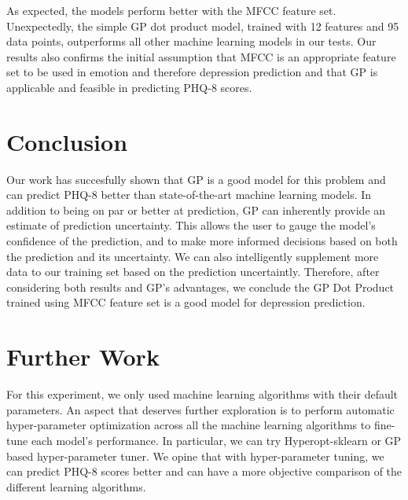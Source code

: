 \documentclass{article}
\begin{document}
	As expected, the models perform better with the MFCC feature set. 
	Unexpectedly, the simple GP dot product model, trained with 12 features and 95 data points, outperforms all other machine learning models in our tests. 
	Our results also confirms the initial assumption that MFCC is an appropriate feature set to be used in emotion and therefore depression prediction and that GP is 
	applicable and feasible in predicting PHQ-8 scores.

	\section{Conclusion}	
	Our work has succesfully shown that GP is a good model for this problem and can predict PHQ-8 better than state-of-the-art machine learning models. 
	In addition to being on par or better at prediction, GP can inherently provide an estimate of prediction uncertainty. 
	This allows the user to gauge the model's confidence of the prediction, and to make more informed decisions based on both the prediction and its uncertainty. 
	We can also intelligently supplement more data to our training set based on the prediction uncertaintly. 
	Therefore, after considering both results and GP's advantages, we conclude the GP Dot Product trained using MFCC feature set is a good model for 
	depression prediction.
	
	\section{Further Work}
	For this experiment, we only used machine learning algorithms with their default parameters. 
	An aspect that deserves further exploration is to perform automatic hyper-parameter optimization
	across all the machine learning algorithms to fine-tune each model's performance. 
	In particular, we can try Hyperopt-sklearn \cite{Komer2014HyperoptsklearnAH} or GP based hyper-parameter tuner. 
	We opine that with hyper-parameter tuning, we can predict PHQ-8 scores better and can have a more objective comparison of the different learning algorithms.
	
\end{document}
